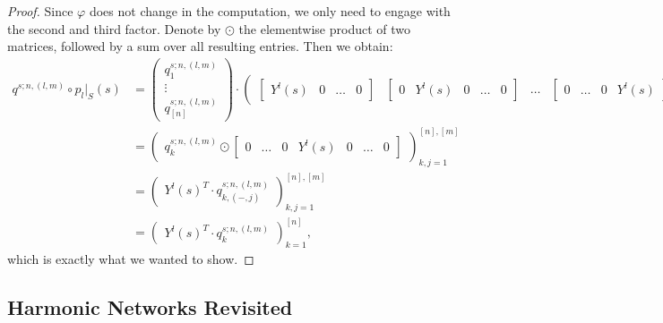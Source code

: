 \documentclass[12pt, a4paper]{article}
\theoremstyle{plain}
\theoremstyle{definition}
\theoremstyle{remark}
\begin{document}
\begin{proof}
Since $\varphi$ does not change in the computation, we only need to engage with the second and third factor. Denote by $\odot$ the elementwise product of two matrices, followed by a sum over all resulting entries. Then we obtain:
\begin{align*}
q^{s;n,(l,m)} \circ p_l|_S(s) & = 
\begin{pmatrix}
q^{s;n,(l,m)}_1 \\
\vdots \\
q^{s;n,(l,m)}_{[n]}
\end{pmatrix} \cdot  \begin{pmatrix}
\begin{bmatrix}
Y^l(s) & 0 & \hdots & 0
\end{bmatrix}
&
\begin{bmatrix}
0 & Y^l(s) & 0 & \hdots & 0
\end{bmatrix}
&
\hdots
&
\begin{bmatrix}
0 & \hdots & 0 & Y^l(s)
\end{bmatrix}
\end{pmatrix}\\
& = 
\begin{pmatrix}
q^{s;n,(l,m)}_{k} \odot \begin{bmatrix}0 & \hdots & 0 & Y^l(s) & 0 & \hdots & 0 \end{bmatrix}
\end{pmatrix}_{k, j = 1}^{[n], [m]} \\
& = \begin{pmatrix}
Y^l(s)^T \cdot q^{s;n,(l,m)}_{k, (-,j)}
\end{pmatrix}_{k, j = 1}^{[n], [m]} \\
& = \begin{pmatrix}
Y^l(s)^T \cdot q^{s;n,(l,m)}_{k}
\end{pmatrix}_{k=1}^{[n]},
\end{align*}
which is exactly what we wanted to show.
\end{proof}

\subsection{Harmonic Networks Revisited}
\end{document}
